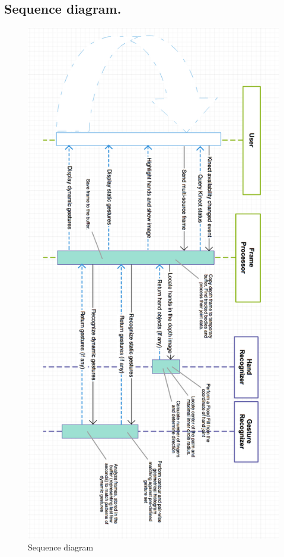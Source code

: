 \documentclass[a4paper,11pt,oneside]{article}
\begin{document}
\subsection{Sequence diagram.}

 \begin{figure}[H]
  \centering
  \includegraphics[scale=0.55]{sequence-dia.png}
  \caption{Sequence diagram}
  \end{figure}

  \renewcommand{\refname}{\section{References}}
  
  
  
\end{document}
